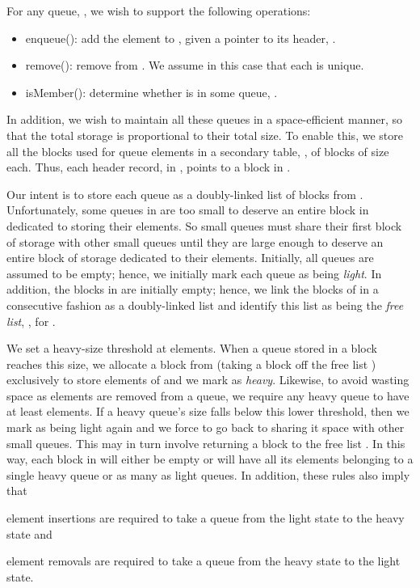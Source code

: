 \documentclass[11pt,letterpaper]{article}
\begin{document}
For any queue, , we wish to support the following operations:
\begin{itemize}
\item
enqueue():
add the element  to , given a pointer to its header, . 
\item
remove(): remove  from .
We assume in this case that each  is unique.
\item
isMember(): determine whether  is in some queue, .
\end{itemize}

In addition, we wish to maintain all these queues in a space-efficient
manner, so that the total storage is proportional to their total size.
To enable this, we store
all the blocks used for queue elements in a secondary table,
, of blocks of size  each.
Thus, each header record,  in , points to a block in .

Our intent is to store each queue  as a doubly-linked
list of blocks from .  Unfortunately, some queues in  are too
small to deserve an entire block in  dedicated to storing their elements.
So small queues must share their first block of storage with other small
queues until they are large enough to deserve an entire block of storage
dedicated to their elements.
Initially, all queues are assumed to be empty; hence, we initially
mark each queue as
being \emph{light}.
In addition, the blocks in  are initially empty; hence, we link the
blocks of  in a consecutive fashion as a doubly-linked list and
identify this list as being the \emph{free list}, , for .

We set a heavy-size threshold at  elements. When a queue  stored in a block  reaches
this size, we allocate a block from  (taking a block off the free
list ) 
exclusively to store elements of  and we mark  as \emph{heavy}. 
Likewise, to avoid wasting space as
elements are removed from a queue, we require any heavy queue  to
have at least  elements. If a heavy queue's size falls below this
lower threshold, then we mark  as being light again
and we force  to go back to sharing it space with other small queues.
This may in turn involve returning a block to the free list .
In this way,
each block  in  will either be empty or will have all its
elements belonging to a single heavy queue or as many as  light queues.
In addition, these rules also imply that 
 
element insertions are required to take a queue from the light state to the 
heavy state
and
 
element removals are required to take a queue from the heavy state to the light
state.
\end{document}
